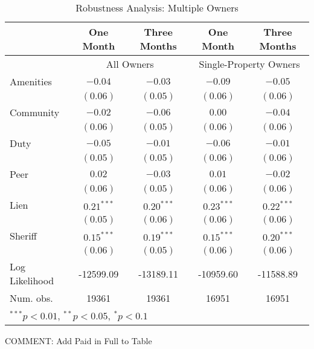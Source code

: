 \documentclass[12pt]{article}
\begin{document}
\begin{sidewaystable}[htbp]
\caption{Robustness Analysis: Multiple Owners}\label{pc_rob_s}
\begin{center}
\begin{tabular}{|l| c c | c c | }
\hline
               & One Month & Three Months  & One Month & Three Months  \\
\hline
 & \multicolumn{2}{c}{All Owners} & \multicolumn{2}{|c|}{Single-Property Owners} \\
Amenities      & $-0.04$      & $-0.03$         & $-0.09$      & $-0.05$          \\
               & $(0.06)$     & $(0.05)$         & $(0.06)$     & $(0.06)$        \\
Community          & $-0.02$      & $-0.06$          & $0.00$       & $-0.04$        \\
               & $(0.06)$     & $(0.05)$        & $(0.06)$     & $(0.06)$       \\
Duty           & $-0.05$      & $-0.01$         & $-0.06$      & $-0.01$       \\
               & $(0.05)$     & $(0.05)$        & $(0.06)$     & $(0.06)$      \\
Peer           & $0.02$       & $-0.03$         & $0.01$       & $-0.02$        \\
               & $(0.06)$     & $(0.05)$       & $(0.06)$     & $(0.06)$     \\
Lien           & $0.21^{***}$ & $0.20^{***}$  & $0.23^{***}$ & $0.22^{***}$  \\
               & $(0.05)$     & $(0.06)$        & $(0.06)$     & $(0.06)$       \\
Sheriff        & $0.15^{***}$ & $0.19^{***}$  & $0.15^{***}$ & $0.20^{***}$  \\
               & $(0.06)$     & $(0.05)$        & $(0.06)$     & $(0.06)$     \\
\hline
Log Likelihood & -12599.09    & -13189.11     & -10959.60    & -11588.89       \\
Num. obs.      & 19361        & 19361              & 16951        & 16951            \\
\hline
\multicolumn{5}{l}{\scriptsize{$^{***}p<0.01$, $^{**}p<0.05$, $^*p<0.1$}}
\end{tabular}
\end{center}
\end{sidewaystable}

COMMENT: Add Paid in Full to Table
\end{document}
